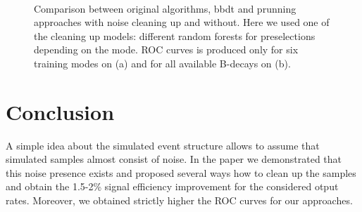 \documentclass{llncs}
\begin{document}
\begin{figure}
\begin{center}
\begin{subfigure}[b]{0.45\textwidth}
    	\end{subfigure}
    \end{center}
  \caption{Comparison between original algorithms, bbdt and prunning approaches with noise cleaning up and without. Here we used one of the cleaning up models: different random forests for preselections depending on the mode. ROC curves is produced only for six training modes on (a) and for all available B-decays on (b).}~\label{fig:speedup_rocs}
\end{figure}

\section{Conclusion}
A simple idea about the simulated event structure allows to assume that simulated samples almost consist of noise. In the paper we demonstrated that this noise presence exists and proposed several ways how to clean up the samples and obtain the 1.5-2\% signal efficiency improvement for the considered otput rates. Moreover, we obtained strictly higher the ROC curves for our approaches.
\end{document}
